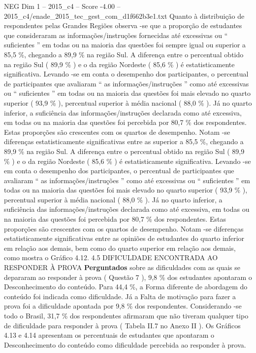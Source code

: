 \begin{textsample}{NEG Dim 1 – 2015\_c4 – Score -4.00 – 2015\_c4/enade\_2015\_tec\_gest\_com\_d1f662b3e1.txt}
Quanto à distribuição de respondentes pelas Grandes Regiões observa -se que a proporção de estudantes que consideraram as informações/instruções fornecidas até excessivas ou “ suficientes ” em todas ou na maioria das questões foi sempre igual ou superior a 85,5 \%, chegando a 89,9 \% na região Sul.
A diferença entre o percentual obtido na região Sul ( 89,9 \% ) e o da região Nordeste ( 85,6 \% ) é estatisticamente significativa.
Levando -se em conta o desempenho dos participantes, o percentual de participantes que avaliaram “ as informações/instruções ” como até excessivas ou “ suficientes ” em todas ou na maioria das questões foi mais elevado no quarto superior ( 93,9 \% ), percentual superior à média nacional ( 88,0 \% ).
Já no quarto inferior, a suficiência das informações/instruções declarada como até excessiva, em todas ou na maioria das questões foi percebida por 80,7 \% dos respondentes.
Estas proporções são crescentes com os quartos de desempenho.
Notam -se diferenças estatisticamente significativas entre as superior a 85,5 \%, chegando a 89,9 \% na região Sul.
A diferença entre o percentual obtido na região Sul ( 89,9 \% ) e o da região Nordeste ( 85,6 \% ) é estatisticamente significativa.
Levando -se em conta o desempenho dos participantes, o percentual de participantes que avaliaram “ as informações/instruções ” como até excessivas ou “ suficientes ” em todas ou na maioria das questões foi mais elevado no quarto superior ( 93,9 \% ), percentual superior à média nacional ( 88,0 \% ).
Já no quarto inferior, a suficiência das informações/instruções declarada como até excessiva, em todas ou na maioria das questões foi percebida por 80,7 \% dos respondentes.
Estas proporções são crescentes com os quartos de desempenho.
Notam -se diferenças estatisticamente significativas entre as opiniões de estudantes do quarto inferior em relação aos demais, bem como do quarto superior em relação aos demais, como mostra o Gráfico 4.12. 4.5 DIFICULDADE ENCONTRADA AO RESPONDER À PROVA \textbf{Perguntados} sobre as dificuldades com as quais se depararam ao responder à prova ( Questão 7 ), 9,8 \% dos estudantes apontaram o Desconhecimento do conteúdo.
Para 44,4 \%, a Forma diferente de abordagem do conteúdo foi indicada como dificuldade.
Já a Falta de motivação para fazer a prova foi a dificuldade apontada por 9,8 \% dos respondentes.
Considerando -se todo o Brasil, 31,7 \% dos respondentes afirmaram que não tiveram qualquer tipo de dificuldade para responder à prova ( Tabela II.7 no Anexo II ).
Os Gráficos 4.13 e 4.14 apresentam os percentuais de estudantes que apontaram o Desconhecimento do conteúdo como dificuldade percebida ao responder à prova.

\end{textsample}
